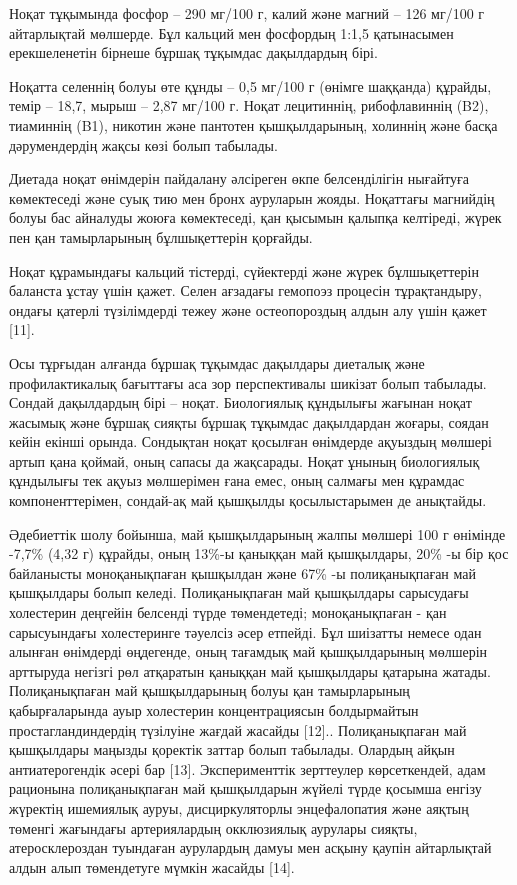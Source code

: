 Ноқат тұқымында фосфор -- 290 мг/100 г, калий және магний -- 126 мг/100
г айтарлықтай мөлшерде. Бұл кальций мен фосфордың 1:1,5 қатынасымен
ерекшеленетін бірнеше бұршақ тұқымдас дақылдардың бірі.

Ноқатта селеннің болуы өте құнды -- 0,5 мг/100 г (өнімге шаққанда)
құрайды, темір -- 18,7, мырыш -- 2,87 мг/100 г. Ноқат лецитиннің,
рибофлавиннің (B2), тиаминнің (B1), никотин және пантотен қышқылдарының,
холиннің және басқа дәрумендердің жақсы көзі болып табылады.

Диетада ноқат өнімдерін пайдалану әлсіреген өкпе белсенділігін нығайтуға
көмектеседі және суық тию мен бронх ауруларын жояды. Ноқаттағы магнийдің
болуы бас айналуды жоюға көмектеседі, қан қысымын қалыпқа келтіреді,
жүрек пен қан тамырларының бұлшықеттерін қорғайды.

Ноқат құрамындағы кальций тістерді, сүйектерді және жүрек бұлшықеттерін
баланста ұстау үшін қажет. Селен ағзадағы гемопоэз процесін
тұрақтандыру, ондағы қатерлі түзілімдерді тежеу және остеопороздың алдын
алу үшін қажет {[}11{]}.

Осы тұрғыдан алғанда бұршақ тұқымдас дақылдары диеталық және
профилактикалық бағыттағы аса зор перспективалы шикізат болып табылады.
Сондай дақылдардың бірі -- ноқат. Биологиялық құндылығы жағынан ноқат
жасымық және бұршақ сияқты бұршақ тұқымдас дақылдардан жоғары, соядан
кейін екінші орында. Сондықтан ноқат қосылған өнімдерде ақуыздың мөлшері
артып қана қоймай, оның сапасы да жақсарады. Ноқат ұнының биологиялық
құндылығы тек ақуыз мөлшерімен ғана емес, оның салмағы мен құрамдас
компоненттерімен, сондай-ақ май қышқылды қосылыстарымен де анықтайды.

Әдебиеттік шолу бойынша, май қышқылдарының жалпы мөлшері 100 г өнімінде
-7,7\% (4,32 г) құрайды, оның 13\%-ы қаныққан май қышқылдары, 20\% -ы
бір қос байланысты моноқанықпаған қышқылдан және 67\% -ы полиқанықпаған
май қышқылдары болып келеді. Полиқанықпаған май қышқылдары сарысудағы
холестерин деңгейін белсенді түрде төмендетеді; моноқанықпаған - қан
сарысуындағы холестеринге тәуелсіз әсер етпейді. Бұл шиізатты немесе
одан алынған өнімдерді өңдегенде, оның тағамдық май қышқылдарының
мөлшерін арттыруда негізгі рөл атқаратын қаныққан май қышқылдары
қатарына жатады. Полиқанықпаған май қышқылдарының болуы қан тамырларының
қабырғаларында ауыр холестерин концентрациясын болдырмайтын
простагландиндердің түзілуіне жағдай жасайды {[}12{]}.. Полиқанықпаған
май қышқылдары маңызды қоректік заттар болып табылады. Олардың айқын
антиатерогендік әсері бар {[}13{]}. Эксперименттік зерттеулер
көрсеткендей, адам рационына полиқанықпаған май қышқылдарын жүйелі түрде
қосымша енгізу жүректің ишемиялық ауруы, дисциркуляторлы энцефалопатия
және аяқтың төменгі жағындағы артериялардың окклюзиялық аурулары сияқты,
атеросклероздан туындаған аурулардың дамуы мен асқыну қаупін айтарлықтай
алдын алып төмендетуге мүмкін жасайды {[}14{]}.

